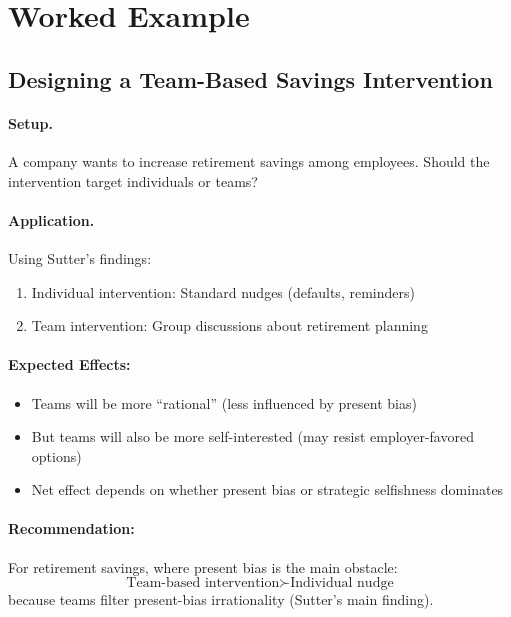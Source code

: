 \section{Worked Example}
\label{sec:su-example}

\subsection{Designing a Team-Based Savings Intervention}

\paragraph{Setup.} A company wants to increase retirement savings among employees. Should the intervention target individuals or teams?

\paragraph{Application.} Using Sutter's findings:
\begin{enumerate}
\item Individual intervention: Standard nudges (defaults, reminders)
\item Team intervention: Group discussions about retirement planning
\end{enumerate}

\paragraph{Expected Effects:}
\begin{itemize}
\item Teams will be more ``rational'' (less influenced by present bias)
\item But teams will also be more self-interested (may resist employer-favored options)
\item Net effect depends on whether present bias or strategic selfishness dominates
\end{itemize}

\paragraph{Recommendation:}
For retirement savings, where present bias is the main obstacle:
\begin{equation}
\text{Team-based intervention} \succ \text{Individual nudge}
\end{equation}
because teams filter present-bias irrationality (Sutter's main finding).


